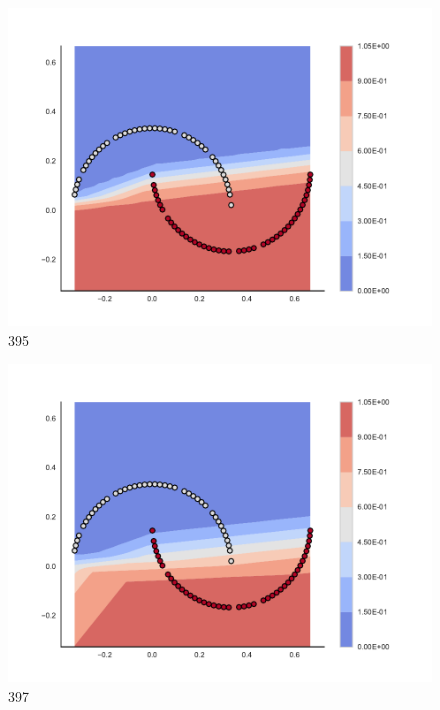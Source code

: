 \begin{subfigure}[b]{0.09\textwidth}
    \includegraphics[clip, trim=2.35cm 1.75cm 4.5cm 0cm,width=\textwidth]{img/convergence/395.pdf}
    \caption{395}
    \label{fig:convergence_395}
\end{subfigure}
%
\begin{subfigure}[b]{0.09\textwidth}
    \includegraphics[clip, trim=2.35cm 1.75cm 4.5cm 0cm,width=\textwidth]{img/convergence/397.pdf}
    \caption{397}
    \label{fig:convergence_397}
\end{subfigure}
%
